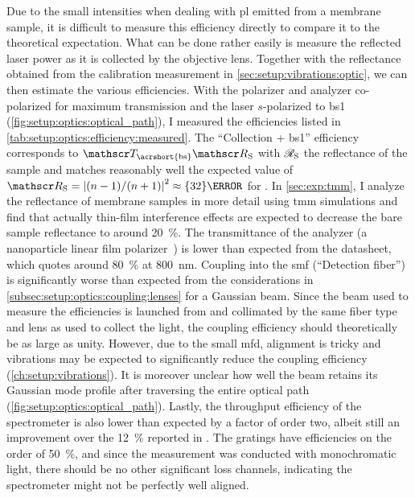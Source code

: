 Due to the small intensities when dealing with \gls{pl} emitted from a membrane sample, it is difficult to measure this efficiency directly to compare it to the theoretical expectation.
What can be done rather easily is measure the reflected laser power as it is collected by the objective lens.
Together with the reflectance obtained from the calibration measurement in \cref{sec:setup:vibrations:optic}, we can then estimate the various efficiencies.
With the polarizer and analyzer co-polarized for maximum transmission and the laser $s$-polarized \wrt to \gls{bs}1 (\cf \cref{fig:setup:optics:optical_path}), I measured the efficiencies listed in \cref{tab:setup:optics:efficiency:measured}.
The \enquote{Collection + \gls{bs}1} efficiency corresponds to $\transmittance_{\mr{\acrshort{bs}}}\reflectance_{\mr{S}}$ with $\mathscr{R}_{\mathrm{S}}$ the reflectance of the sample and matches reasonably well the expected value of $\reflectance_{\mr{S}}=\abs{(n-1)/(n+1)}^2\approx\qty{32}{\percent}$ for .
In \cref{sec:exp:tmm}, I analyze the reflectance of membrane samples in more detail using \gls{tmm} simulations and find that actually thin-film interference effects are expected to decrease the bare sample reflectance to around \qty{20}{\percent}.
The transmittance of the analyzer (a nanoparticle linear film polarizer~\cite{ThorlabsLPVIS050-MP2}) is lower than expected from the datasheet, which quotes around \qty{80}{\percent} at \qty{800}{\nano\meter}.
Coupling into the \gls{smf} (\enquote{Detection fiber}) is significantly worse than expected from the considerations in \cref{subsec:setup:optics:coupling:lenses} for a Gaussian beam.
Since the beam used to measure the efficiencies is launched from and collimated by the same fiber type and lens as used to collect the light, the coupling efficiency should theoretically be as large as unity.
However, due to the small \gls{mfd}, alignment is tricky and vibrations may be expected to significantly reduce the coupling efficiency (\cf \cref{ch:setup:vibrations}).
It is moreover unclear how well the beam retains its Gaussian  mode profile after traversing the entire optical path (\cf \cref{fig:setup:optics:optical_path}).
Lastly, the throughput efficiency of the spectrometer is also lower than expected by a factor of order two, albeit still an improvement over the \qty{12}{\percent} reported in .
The gratings have efficiencies on the order of \qty{50}{\percent}, and since the measurement was conducted with monochromatic light, there should be no other significant loss channels, indicating the spectrometer might not be perfectly well aligned.
